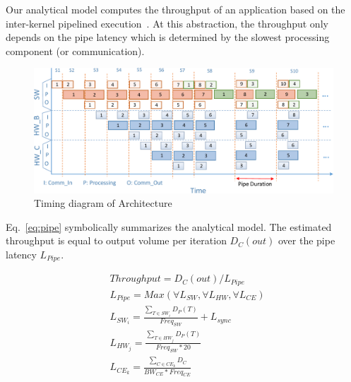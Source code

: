 Our analytical model computes the throughput of an application based on the inter-kernel pipelined execution~\cite{Teimouri_DAC_2015}.
At this abstraction, the throughput only depends on the pipe latency which is determined by the slowest processing component (or communication).

\begin{figure}[h]
	\centering
	\includegraphics[width=\linewidth]{fig/pPipe.pdf}
	\caption{Timing diagram of Architecture}
	\label{fig:Pipe}
	
\end{figure}


Eq.~\eqref{eq:pipe} symbolically summarizes the analytical model. The estimated throughput is equal to output volume per iteration $D_{C}(out)$ over the pipe latency $L_{Pipe}$. 

\begin{equation}
\begin{split}
	&Throughput = D_{C}(out) / L_{Pipe} \\
	&L_{Pipe} = Max (\forall L_{SW}, \forall L_{HW}, \forall L_{CE}) \\
	&L_{SW_i} = \frac{\sum_{T \in SW_i} D_{P}(T)} {Freq_{SW}} + L_{sync} \\
	&L_{HW_j} = \frac{\sum_{T \in HW_j} D_{P}(T)} {Freq_{SW}*20} \\
	&L_{CE_k} = \frac{\sum_{C \in CE_k} D_{C}} {BW_{CE} * Freq_{CE}}
\label{eq:pipe}
\end{split}
\end{equation}

